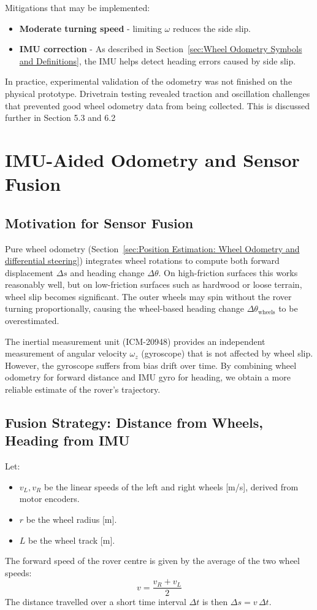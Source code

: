Mitigations that may be implemented:
\begin{itemize}
    \item \textbf{Moderate turning speed} - limiting \(\omega\) reduces the side slip.
    \item \textbf{IMU correction} - As described in Section~\ref{sec:Wheel Odometry Symbols and Definitions}, the IMU helps detect heading errors caused by side slip.
\end{itemize}

In practice, experimental validation of the odometry was not finished on the physical prototype. Drivetrain testing revealed traction and oscillation challenges that prevented good wheel odometry data from being collected. This is discussed further in Section 5.3 and 6.2

\newpage
\section{IMU-Aided Odometry and Sensor Fusion}

\subsection{Motivation for Sensor Fusion}
Pure wheel odometry (Section~\ref{sec:Position Estimation: Wheel Odometry and differential steering}) integrates wheel rotations to compute both forward displacement \(\Delta s\) and heading change \(\Delta\theta\). 
On high-friction surfaces this works reasonably well, but on low-friction surfaces such as hardwood or loose terrain, wheel slip becomes significant. 
The outer wheels may spin without the rover turning proportionally, causing the wheel-based heading change \(\Delta\theta_{\text{wheels}}\) to be overestimated.

The inertial measurement unit (ICM-20948) provides an independent measurement of angular velocity \(\omega_z\) (gyroscope) that is not affected by wheel slip. 
However, the gyroscope suffers from bias drift over time. 
By combining wheel odometry for forward distance and IMU gyro for heading, we obtain a more reliable estimate of the rover's trajectory.

\subsection{Fusion Strategy: Distance from Wheels, Heading from IMU}
Let:
\begin{itemize}
    \item \(v_L, v_R\) be the linear speeds of the left and right wheels [m/s], derived from motor encoders.
    \item \(r\) be the wheel radius [m].
    \item \(L\) be the wheel track [m].
\end{itemize}
The forward speed of the rover centre is given by the average of the two wheel speeds:
\begin{equation}
    v = \frac{v_R + v_L}{2}
\end{equation}
The distance travelled over a short time interval \(\Delta t\) is then \(\Delta s = v \,\Delta t\).

